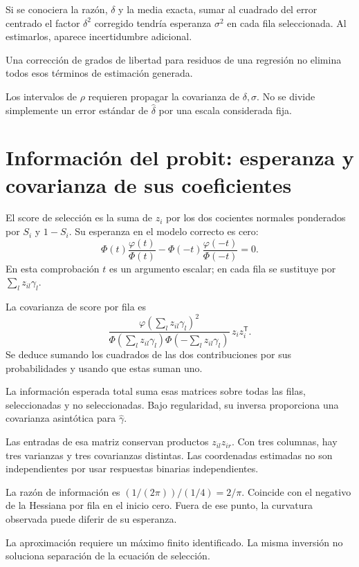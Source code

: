 \documentclass[11pt,a4paper]{article}
\newcommand{\T}{^{\mathsf T}}
\begin{document}
\begin{ejemplo}
Si se conociera la razón,
\(\delta\) y la media exacta,
sumar al cuadrado del error
centrado el factor \(\delta^2\)
corregido tendría esperanza \(\sigma^2\)
en cada fila seleccionada.
Al estimarlos, aparece
incertidumbre adicional.
\end{ejemplo}
Una corrección de grados de libertad
para residuos de una regresión
no elimina todos esos
términos de estimación generada.

Los intervalos de \(\rho\) requieren
propagar la covarianza de
\(\delta,\sigma\).
No se divide simplemente
un error estándar de
\(\widehat\delta\) por una
escala considerada fija.

\clearpage
\section{Información del probit: esperanza y covarianza de sus coeficientes}\label{unidad133}
El score de selección es
la suma de \(z_i\) por
los dos cocientes normales
ponderados por \(S_i\) y \(1-S_i\).
Su esperanza en el
modelo correcto es cero:
\[
\Phi(t)\frac{\varphi(t)}{\Phi(t)}
-\Phi(-t)\frac{\varphi(-t)}{\Phi(-t)}=0.
\]
En esta comprobación \(t\)
es un argumento escalar;
en cada fila se sustituye
por \(\sum_lz_{il}\gamma_l\).

La covarianza de score por fila es
\[
\frac{\varphi(\sum_lz_{il}\gamma_l)^2}
{\Phi(\sum_lz_{il}\gamma_l)\Phi(-\sum_lz_{il}\gamma_l)}
\,z_iz_i\T.
\]
Se deduce sumando los
cuadrados de las dos
contribuciones por sus
probabilidades y usando
que estas suman uno.

La información esperada total
suma esas matrices sobre
todas las filas, seleccionadas
y no seleccionadas.
Bajo regularidad, su inversa
proporciona una covarianza
asintótica para \(\widehat\gamma\).

Las entradas de esa matriz
conservan productos \(z_{il}z_{ir}\).
Con tres columnas,
hay tres varianzas y
tres covarianzas distintas.
Las coordenadas estimadas
no son independientes por
usar respuestas binarias independientes.

\begin{ejemplo}
La razón de información
es \((1/(2\pi))/(1/4)=2/\pi\).
Coincide con el negativo
de la Hessiana por fila
en el inicio cero.
Fuera de ese punto,
la curvatura observada
puede diferir de su esperanza.
\end{ejemplo}
La aproximación requiere un
máximo finito identificado.
La misma inversión no
soluciona separación de la
ecuación de selección.
\end{document}
